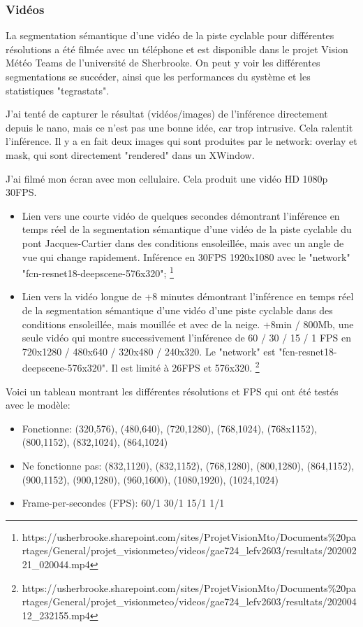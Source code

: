 \subsubsection{Vidéos}
\par La segmentation sémantique d'une vidéo de la piste cyclable pour différentes résolutions a été filmée avec un téléphone et est disponible dans le projet Vision Météo Teams de l'université de Sherbrooke. On peut y voir les différentes segmentations se succéder, ainsi que les performances du système et les statistiques "tegrastats". 
\par J'ai tenté de capturer le résultat (vidéos/images) de l'inférence directement depuis le nano, mais ce n'est pas une bonne idée, car trop intrusive. Cela ralentit l'inférence. Il y a en fait deux images qui sont produites par le network: overlay et mask, qui sont directement "rendered" dans un XWindow. 
\par J'ai filmé mon écran avec mon cellulaire. Cela produit une vidéo HD 1080p 30FPS. 
\begin{itemize}
   \item Lien vers une courte vidéo de quelques secondes démontrant l'inférence en temps réel de la segmentation sémantique d'une vidéo de la piste cyclable du pont Jacques-Cartier dans des conditions ensoleillée, mais avec un angle de vue qui change rapidement. Inférence en 30FPS 1920x1080 avec le "network" "fcn-resnet18-deepscene-576x320"; \footnote{https://usherbrooke.sharepoint.com/sites/ProjetVisionMto/Documents\%20partages/General/projet\_visionmeteo/videos/gae724\_lefv2603/resultats/20200221\_020044.mp4} {\color{red} }
   \item Lien vers la vidéo longue de +8 minutes démontrant l'inférence en temps réel de la segmentation sémantique d'une vidéo d'une piste cyclable dans des conditions ensoleillée, mais mouillée et avec de la neige. +8min / 800Mb, une seule vidéo qui montre successivement l'inférence de 60 / 30 / 15 / 1 FPS en 720x1280 / 480x640 / 320x480 / 240x320. Le "network" est "fcn-resnet18-deepscene-576x320". Il est limité à 26FPS et 576x320. \footnote{https://usherbrooke.sharepoint.com/sites/ProjetVisionMto/Documents\%20partages/General/projet\_visionmeteo/videos/gae724\_lefv2603/resultats/20200412\_232155.mp4}{\color{red} }
\end{itemize}
\par Voici un tableau montrant les différentes résolutions et FPS qui ont été testés avec le modèle:
{
   \color{red}
   \begin{itemize}
      \item Fonctionne: (320,576), (480,640), (720,1280), (768,1024), (768x1152), (800,1152), (832,1024), (864,1024)
      \item Ne fonctionne pas: (832,1120), (832,1152), (768,1280), (800,1280), (864,1152), (900,1152), (900,1280), (960,1600), (1080,1920), (1024,1024)
      \item Frame-per-secondes (FPS): 60/1 30/1 15/1 1/1
   \end{itemize} 
}